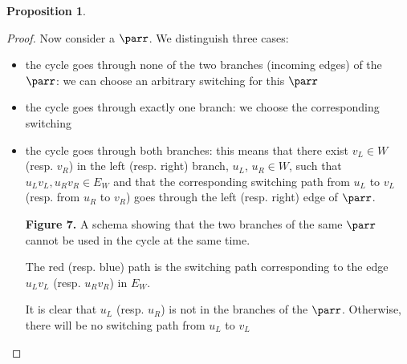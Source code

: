 \documentclass{article}
\theoremstyle{definition}
\newtheorem{proposition}[thm]{Proposition}
\begin{document}
\begin{proposition}
\begin{proof}
  Now consider a $\parr$. We distinguish three cases:
  \begin{itemize}
    \item the cycle goes through none of the two branches (incoming edges) of
	    the $\parr$: we can choose an
	    arbitrary switching for this $\parr$
    \item the cycle goes through exactly one branch: we choose the corresponding
	    switching
    \item the cycle goes through both branches:
	    this means that there exist $v_L \in W$ (resp. $v_R$) in the left
		  (resp. right) branch, $u_L$, $u_R \in W$, such that
		  $u_Lv_L, u_Rv_R \in E_W$ and that the corresponding switching path from $u_L$ to $v_L$ (resp. from $u_R$ to $v_R$) goes through the left (resp. right) edge of $\parr$.
		  
    \begin{center}	
    
    {\bf Figure 7.} A schema showing that the two branches of the same $\parr$ cannot be used in the cycle at the same time. 
    \end{center}
    
    The red (resp. blue) path is the switching path corresponding to the edge $u_Lv_L$ (resp. $u_Rv_R$) in $E_W$.  
    
    It is clear that $u_L$ (resp. $u_R$) is not in the branches of the
	 $\parr$. Otherwise, there will be no switching path from $u_L$ to $v_L$ 


\end{itemize}
\end{proof}
\end{proposition}
\end{document}
